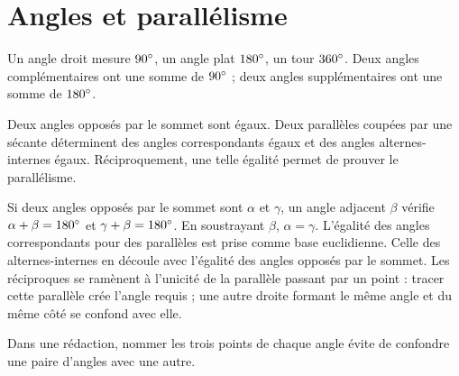 \documentclass[../cours_3e.tex]{subfiles}
\begin{document}
\section{Angles et parallélisme}
Un angle droit mesure $90^{\circ}$, un angle plat $180^{\circ}$, un tour $360^{\circ}$. Deux angles complémentaires ont une somme de $90^{\circ}$ ; deux angles supplémentaires ont une somme de $180^{\circ}$.
\begin{propriete}
Deux angles opposés par le sommet sont égaux. Deux parallèles coupées par une sécante déterminent des angles correspondants égaux et des angles alternes-internes égaux. Réciproquement, une telle égalité permet de prouver le parallélisme.
\end{propriete}
\begin{demonstration}
Si deux angles opposés par le sommet sont $\alpha$ et $\gamma$, un angle adjacent $\beta$ vérifie $\alpha+\beta=180^{\circ}$ et $\gamma+\beta=180^{\circ}$. En soustrayant $\beta$, $\alpha=\gamma$.
L'égalité des angles correspondants pour des parallèles est prise comme base euclidienne. Celle des alternes-internes en découle avec l'égalité des angles opposés par le sommet. Les réciproques se ramènent à l'unicité de la parallèle passant par un point : tracer cette parallèle crée l'angle requis ; une autre droite formant le même angle et du même côté se confond avec elle.
\end{demonstration}
\begin{center}
\end{center}
Dans une rédaction, nommer les trois points de chaque angle évite de confondre une paire d'angles avec une autre.
\end{document}
